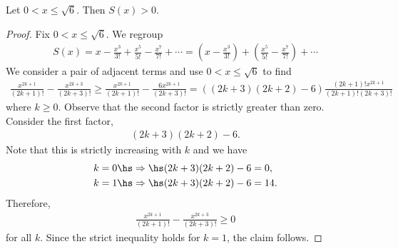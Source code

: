 \documentclass{article}
\begin{document}
\begin{claim*}
   Let $0<x\leq \sqrt{6}$. Then $S(x)>0$. 
\end{claim*}
\begin{proof}
   Fix $0<x\leq\sqrt{6}$. We regroup 
   \begin{align*}
      S(x) = x - \frac{x^3}{3!} + \frac{x^5}{5!} - \frac{x^7}{7!} + \cdots
      = \left(x - \frac{x^3}{3!}\right) + \left(\frac{x^5}{5!} - \frac{x^7}{7!}\right) + \cdots
   \end{align*}
   We consider a pair of adjacent terms and use $0<x\leq\sqrt{6}$ to find 
   \begin{align*}
      \frac{x^{2k+1}}{(2k+1)!} - \frac{x^{2k+3}}{(2k+3)!}
      \geq \frac{x^{2k+1}}{(2k+1)!}-\frac{6x^{2k+1}}{(2k+3)!}
      = ((2k+3)(2k+2)-6)\frac{(2k+1)!x^{2k+1}}{(2k+1)!(2k+3)!}
   \end{align*}
   where $k\geq 0$.
   Observe that the second factor is strictly greater than zero. Consider the first factor,
   \begin{align*}
      (2k+3)(2k+2) - 6.
   \end{align*}
   Note that this is strictly increasing with $k$ and we have 
   \begin{align*}
      k=0 \hs&\Rightarrow\hs (2k+3)(2k+2) - 6 = 0,\\ 
      k=1 \hs&\Rightarrow\hs (2k+3)(2k+2) - 6 = 14.\\ 
   \end{align*}
   Therefore, 
   \begin{align*}
      \frac{x^{2k+1}}{(2k+1)!} - \frac{x^{2k+3}}{(2k+3)!} \geq 0
   \end{align*}
   for all $k$. Since the strict inequality holds for $k=1$, the claim follows.
\end{proof}
\end{document}
